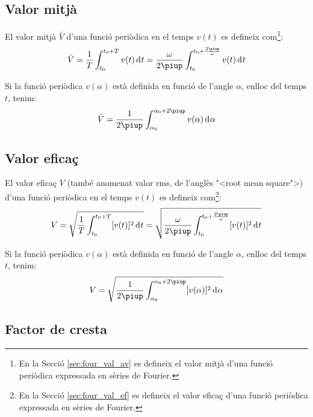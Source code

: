 \subsection{Valor mitj\`{a}}

El valor mitj\`{a} $\bar{V}$ d'una funci\'{o}
peri\`{o}dica en el temps $v(t)$ es
defineix com\footnote{En la Secci\'{o} \ref{sec:four_val_av} es defineix el valor mitj\`{a} d'una funci\'{o} peri\`{o}dica expressada en s\`{e}ries de Fourier.}:
\begin{equation}
    \bar{V} = \frac{1}{T} \int_{t_0}^{t_0+T} v(t) \diff t =
    \frac{\omega}{2\piup} \int_{t_0}^{t_0+\frac{2\piup}{\omega}} v(t) \diff t\label{eq:vm_t}
\end{equation}

Si la funci\'{o} peri\`{o}dica $v(\alpha)$ est\`{a} definida en funci\'{o} de
l'angle $\alpha$, enlloc del temps $t$, tenim:
\begin{equation}
    \bar{V} = \frac{1}{2\piup} \int_{\alpha_0}^{\alpha_0+2\piup} v(\alpha) \diff \alpha
    \label{eq:vm_alfa}
\end{equation}

\subsection{Valor efica\c{c}}

El valor efica\c{c}  $V$ (tamb\'{e} anomenat valor rms, de l'angl\`{e}s {"<}root
mean square{">}) d'una funci\'{o} peri\`{o}dica en el temps $v(t)$ es defineix com\footnote{En la Secci\'{o} \ref{sec:four_val_ef} es defineix el valor efica\c{c} d'una funci\'{o} peri\`{o}dica expressada en s\`{e}ries de Fourier.}:
\begin{equation}
    V = \sqrt{\frac{1}{T} \int_{t_0}^{t_0+T} [v(t)]^2 \diff
    t} = \sqrt{\frac{\omega}{2\piup} \int_{t_0}^{t_0+\frac{2\piup}{\omega}}
     [v(t)]^2 \diff t}
\end{equation}

Si la funci\'{o} peri\`{o}dica $v(\alpha)$ est\`{a} definida en funci\'{o} de
l'angle $\alpha$, enlloc del temps $t$, tenim:
\begin{equation}
    V = \sqrt{\frac{1}{2\piup} \int_{\alpha_0}^{\alpha_0+2\piup}
     [v(\alpha)]^2 \diff \alpha}
\end{equation}

\subsection{Factor de cresta}

